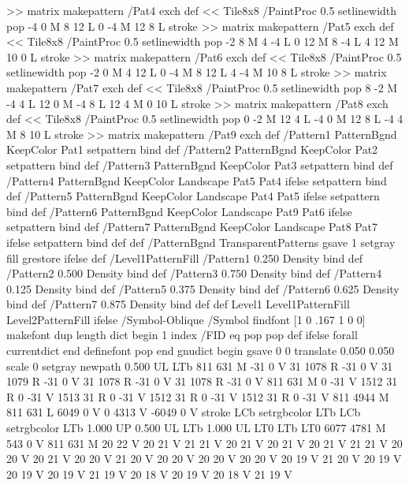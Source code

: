 {{{>> matrix makepattern
/Pat4 exch def
<< Tile8x8
 /PaintProc {0.5 setlinewidth pop -4 0 M 8 12 L
	0 -4 M 12 8 L stroke}
>> matrix makepattern
/Pat5 exch def
<< Tile8x8
 /PaintProc {0.5 setlinewidth pop -2 8 M 4 -4 L
	0 12 M 8 -4 L 4 12 M 10 0 L stroke}
>> matrix makepattern
/Pat6 exch def
<< Tile8x8
 /PaintProc {0.5 setlinewidth pop -2 0 M 4 12 L
	0 -4 M 8 12 L 4 -4 M 10 8 L stroke}
>> matrix makepattern
/Pat7 exch def
<< Tile8x8
 /PaintProc {0.5 setlinewidth pop 8 -2 M -4 4 L
	12 0 M -4 8 L 12 4 M 0 10 L stroke}
>> matrix makepattern
/Pat8 exch def
<< Tile8x8
 /PaintProc {0.5 setlinewidth pop 0 -2 M 12 4 L
	-4 0 M 12 8 L -4 4 M 8 10 L stroke}
>> matrix makepattern
/Pat9 exch def
/Pattern1 {PatternBgnd KeepColor Pat1 setpattern} bind def
/Pattern2 {PatternBgnd KeepColor Pat2 setpattern} bind def
/Pattern3 {PatternBgnd KeepColor Pat3 setpattern} bind def
/Pattern4 {PatternBgnd KeepColor Landscape {Pat5} {Pat4} ifelse setpattern} bind def
/Pattern5 {PatternBgnd KeepColor Landscape {Pat4} {Pat5} ifelse setpattern} bind def
/Pattern6 {PatternBgnd KeepColor Landscape {Pat9} {Pat6} ifelse setpattern} bind def
/Pattern7 {PatternBgnd KeepColor Landscape {Pat8} {Pat7} ifelse setpattern} bind def
} def
%
%
%
/PatternBgnd {
  TransparentPatterns {} {gsave 1 setgray fill grestore} ifelse
} def
%
%
/Level1PatternFill {
/Pattern1 {0.250 Density} bind def
/Pattern2 {0.500 Density} bind def
/Pattern3 {0.750 Density} bind def
/Pattern4 {0.125 Density} bind def
/Pattern5 {0.375 Density} bind def
/Pattern6 {0.625 Density} bind def
/Pattern7 {0.875 Density} bind def
} def
%
%
Level1 {Level1PatternFill} {Level2PatternFill} ifelse
%
/Symbol-Oblique /Symbol findfont [1 0 .167 1 0 0] makefont
dup length dict begin {1 index /FID eq {pop pop} {def} ifelse} forall
currentdict end definefont pop
end
gnudict begin
gsave
0 0 translate
0.050 0.050 scale
0 setgray
newpath
0.500 UL
LTb
811 631 M
-31 0 V
31 1078 R
-31 0 V
31 1079 R
-31 0 V
31 1078 R
-31 0 V
31 1078 R
-31 0 V
811 631 M
0 -31 V
1512 31 R
0 -31 V
1513 31 R
0 -31 V
1512 31 R
0 -31 V
1512 31 R
0 -31 V
811 4944 M
811 631 L
6049 0 V
0 4313 V
-6049 0 V
stroke
LCb setrgbcolor
LTb
LCb setrgbcolor
LTb
1.000 UP
0.500 UL
LTb
1.000 UL
LT0
LTb
LT0
6077 4781 M
543 0 V
811 631 M
20 22 V
20 21 V
21 21 V
20 21 V
20 21 V
20 21 V
21 21 V
20 20 V
20 21 V
20 20 V
21 20 V
20 20 V
20 20 V
20 20 V
20 19 V
21 20 V
20 19 V
20 19 V
20 19 V
21 19 V
20 18 V
20 19 V
20 18 V
21 19 V
}}
